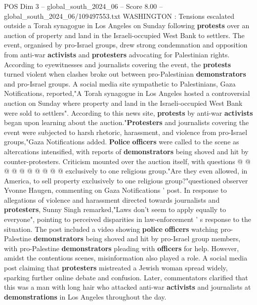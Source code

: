 \begin{textsample}{POS Dim 3 – global\_south\_2024\_06 – Score 8.00 – global\_south\_2024\_06/109497553.txt}  \label{ex:f3_pos_348}
WASHINGTON : Tensions escalated outside a Torah synagogue in Los Angeles on Sunday following \textbf{protests} over an auction of property and land in the Israeli-occupied West Bank to settlers.
The event, organised by pro-Israel groups, drew strong condemnation and opposition from anti-war \textbf{activists} and \textbf{protesters} advocating for Palestinian rights.
According to eyewitnesses and journalists covering the event, the \textbf{protests} turned violent when clashes broke out between pro-Palestinian \textbf{demonstrators} and pro-Israel groups.
A social media site sympathetic to Palestinians, Gaza Notifications, reported,"A Torah synagogue in Los Angeles hosted a controversial auction on Sunday where property and land in the Israeli-occupied West Bank were sold to settlers".
According to this news site, \textbf{protests} by anti-war \textbf{activists} began upon learning about the auction."\textbf{Protesters} and journalists covering the event were subjected to harsh rhetoric, harassment, and violence from pro-Israel groups,"Gaza Notifications added. \textbf{Police} \textbf{officers} were called to the scene as altercations intensified, with reports of \textbf{demonstrators} being shoved and hit by counter-protesters.
Criticism mounted over the auction itself, with questions @ @ @ @ @ @ @ @ @ @ exclusively to one religious group."Are they even allowed, in America, to sell property exclusively to one religious group?"questioned observer Yvonne Haugen, commenting on Gaza Notifications ' post.
In response to allegations of violence and harassment directed towards journalists and \textbf{protesters}, Sunny Singh remarked,"Laws don't seem to apply equally to everyone", pointing to perceived disparities in law-enforcement ' s response to the situation.
The post included a video showing \textbf{police} \textbf{officers} watching pro-Palestine \textbf{demonstrators} being shoved and hit by pro-Israel group members, with pro-Palestine \textbf{demonstrators} pleading with \textbf{officers} for help.
However, amidst the contentious scenes, misinformation also played a role.
A social media post claiming that \textbf{protesters} mistreated a Jewish woman spread widely, sparking further online debate and confusion.
Later, commentators clarified that this was a man with long hair who attacked anti-war \textbf{activists} and journalists at \textbf{demonstrations} in Los Angeles throughout the day.

\end{textsample}
